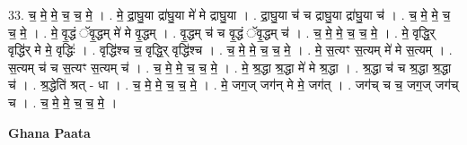\documentclass[17pt]{extarticle}
\begin{document}
33. च॒ मे॒ मे॒ च॒ च॒ मे॒ । . मे॒ द्रा॒घु॒या द्रा॑घु॒या मे॑ मे द्राघु॒या । . द्रा॒घु॒या च॑ च द्राघु॒या द्रा॑घु॒या च॑ । . च॒ मे॒ मे॒ च॒ च॒ मे॒ । . मे॒ वृ॒द्धं ॅवृ॒द्धम् मे॑ मे वृ॒द्धम् । . वृ॒द्धम् च॑ च वृ॒द्धं ॅवृ॒द्धम् च॑ । . च॒ मे॒ मे॒ च॒ च॒ मे॒ । . मे॒ वृद्धि॒र् वृद्धि॑र् मे मे॒ वृद्धिः॑ । . वृद्धि॑श्च च॒ वृद्धि॒र् वृद्धि॑श्च । . च॒ मे॒ मे॒ च॒ च॒ मे॒ । . मे॒ स॒त्यꣳ स॒त्यम् मे॑ मे स॒त्यम् । . स॒त्यम् च॑ च स॒त्यꣳ स॒त्यम् च॑ । . च॒ मे॒ मे॒ च॒ च॒ मे॒ । . मे॒ श्र॒द्धा श्र॒द्धा मे॑ मे श्र॒द्धा । . श्र॒द्धा च॑ च श्र॒द्धा श्र॒द्धा च॑ । . श्र॒द्धेति॑ श्रत् - धा । . च॒ मे॒ मे॒ च॒ च॒ मे॒ । . मे॒ जग॒ज् जग॑न् मे मे॒ जग॑त् । . जग॑च् च च॒ जग॒ज् जग॑च् च । . च॒ मे॒ मे॒ च॒ च॒ मे॒ । \newline

\textbf{Ghana Paata } \newline
\end{document}
